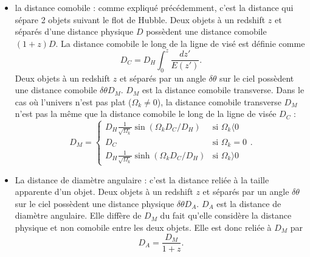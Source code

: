 \documentclass[11pt, twoside, a4paper, openright]{report}
\begin{document}
\begin{itemize}[label=$\bullet$]
\item la distance comobile : comme expliqué précédemment, c'est la distance qui sépare 2 objets suivant le flot de Hubble. Deux objets à un redshift $z$ et séparés d'une distance physique $D$ possèdent une distance comobile $(1+z)D$. La distance comobile le long de la ligne de visé est définie comme
  \begin{equation}
    \label{eq:dist_como}
    D_{C} = D_H \int_0^z \frac{dz'}{E(z')} .
  \end{equation}
  Deux objets à un redshift $z$ et séparés par un angle $\delta \theta$ sur le ciel possèdent une distance comobile $\delta \theta D_M$. $D_M$ est la distance comobile transverse. 
  Dans le cas où l'univers n'est pas plat ($\Omega_k \neq 0$), la distance comobile transverse $D_M$  n'est pas la même que la distance comobile le long de la ligne de visée $D_{C}$ :
  \begin{equation}
    \label{eq:dist_como_trans}
    D_M = \left\{
      \begin{array}{ll}
        D_H \frac{1}{\sqrt{\Omega_k}} \sin(\Omega_k D_C / D_H) & \mbox{si } \Omega_k \langle 0 \\
        D_C & \textrm{si } \Omega_k = 0 \\
        D_H \frac{1}{\sqrt{\Omega_k}} \sinh(\Omega_k D_C / D_H) & \mbox{si } \Omega_k \rangle 0
      \end{array}
    \right..
  \end{equation}
  
\item La distance de diamètre angulaire : c'est la distance reliée à la taille apparente d'un objet. Deux objets à un redshift $z$ et séparés par un angle $\delta \theta$ sur le ciel possèdent une distance physique $\delta \theta D_A$. $D_A$ est la distance de diamètre angulaire. Elle diffère de $D_M$ du fait qu'elle considère la distance physique et non comobile entre les deux objets. Elle est donc reliée à $D_M$ par
  \begin{equation}
    \label{eq:dist_ang}
    D_A = \frac{D_M}{1+z}.
  \end{equation}


\end{itemize}
\end{document}
